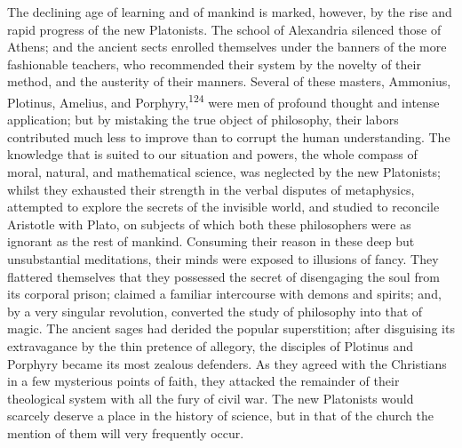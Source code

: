 The declining age of learning and of mankind is marked, however,
by the rise and rapid progress of the new Platonists. The school
of Alexandria silenced those of Athens; and the ancient sects
enrolled themselves under the banners of the more fashionable
teachers, who recommended their system by the novelty of their
method, and the austerity of their manners. Several of these
masters, Ammonius, Plotinus, Amelius, and Porphyry,\textsuperscript{124} were men
of profound thought and intense application; but by mistaking the
true object of philosophy, their labors contributed much less to
improve than to corrupt the human understanding. The knowledge
that is suited to our situation and powers, the whole compass of
moral, natural, and mathematical science, was neglected by the
new Platonists; whilst they exhausted their strength in the
verbal disputes of metaphysics, attempted to explore the secrets
of the invisible world, and studied to reconcile Aristotle with
Plato, on subjects of which both these philosophers were as
ignorant as the rest of mankind. Consuming their reason in these
deep but unsubstantial meditations, their minds were exposed to
illusions of fancy. They flattered themselves that they possessed
the secret of disengaging the soul from its corporal prison;
claimed a familiar intercourse with demons and spirits; and, by a
very singular revolution, converted the study of philosophy into
that of magic. The ancient sages had derided the popular
superstition; after disguising its extravagance by the thin
pretence of allegory, the disciples of Plotinus and Porphyry
became its most zealous defenders. As they agreed with the
Christians in a few mysterious points of faith, they attacked the
remainder of their theological system with all the fury of civil
war. The new Platonists would scarcely deserve a place in the
history of science, but in that of the church the mention of them
will very frequently occur.


